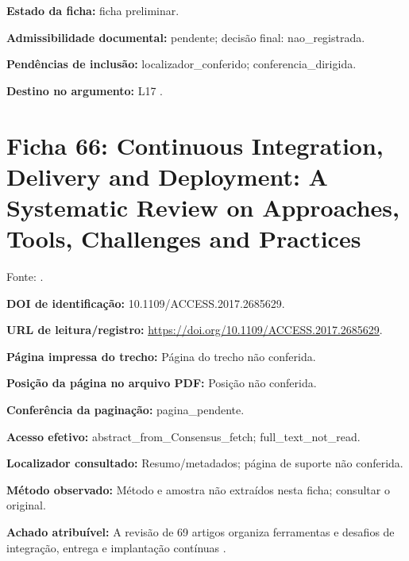 \noindent\textbf{Estado da ficha:} ficha preliminar.\par\medskip

\noindent\textbf{Admissibilidade documental:} pendente; decisão final: nao\_registrada.\par\medskip

\noindent\textbf{Pendências de inclusão:} localizador\_conferido; conferencia\_dirigida.\par\medskip

\noindent\textbf{Destino no argumento:} L17 .

\clearpage\section*{Ficha 66: Continuous Integration, Delivery and Deployment: A Systematic Review on Approaches, Tools, Challenges and Practices}

Fonte: \citet{eng14}.

\noindent\textbf{DOI de identificação:} 10.1109/ACCESS.2017.2685629.\par\medskip

\noindent\textbf{URL de leitura/registro:} \url{https://doi.org/10.1109/ACCESS.2017.2685629}.\par\medskip

\noindent\textbf{Página impressa do trecho:} Página do trecho não conferida.\par\medskip

\noindent\textbf{Posição da página no arquivo PDF:} Posição não conferida.\par\medskip

\noindent\textbf{Conferência da paginação:} pagina\_pendente.\par\medskip

\noindent\textbf{Acesso efetivo:} abstract\_from\_Consensus\_fetch; full\_text\_not\_read.\par\medskip

\noindent\textbf{Localizador consultado:} Resumo/metadados; página de suporte não conferida.\par\medskip

\noindent\textbf{Método observado:} Método e amostra não extraídos nesta ficha; consultar o original.\par\medskip

\noindent\textbf{Achado atribuível:} A revisão de 69 artigos organiza ferramentas e desafios de integração, entrega e implantação contínuas \citep{eng14}.\par\medskip

